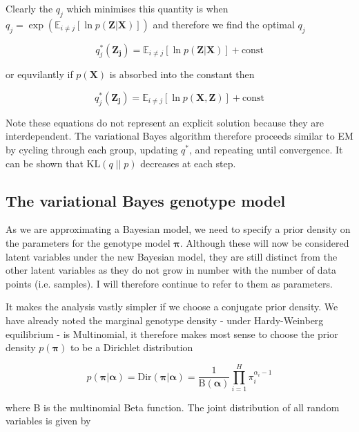 \documentclass{article}
\begin{document}
Clearly the $q_j$ which minimises this quantity is when $q_j = \exp(\mathbb{E}_{i \ne j}[\ln p(\boldsymbol{Z} | \boldsymbol{X})])$ and therefore we find the optimal $q_j$

\begin{equation}
q^*_j(\boldsymbol{Z_j}) = \mathbb{E}_{i \ne j}[\ln p(\boldsymbol{Z} | \boldsymbol{X})] + \text{const}
\end{equation}

or equvilantly if $p(\boldsymbol{X})$ is absorbed into the constant then

\begin{equation}
\label{eq:q_opt}
q^*_j(\boldsymbol{Z_j}) = \mathbb{E}_{i \ne j}[\ln p(\boldsymbol{X}, \boldsymbol{Z})] + \text{const}
\end{equation}

Note these equations do not represent an explicit solution because they are interdependent. The variational Bayes algorithm therefore proceeds similar to EM by cycling through each group, updating $q^*$, and repeating until convergence. It can be shown that $\text{KL}(q\; ||\; p)$ decreases at each step.

\subsection{The variational Bayes genotype model}

As we are approximating a Bayesian model, we need to specify a prior density on the parameters for the genotype model $\boldsymbol{\pi}$. Although these will now be considered latent variables under the new Bayesian model, they are still distinct from the other latent variables as they do not grow in number with the number of data points (i.e. samples). I will therefore continue to refer to them as parameters. 

It makes the analysis vastly simpler if we choose a conjugate prior density. We have already noted the marginal genotype density - under Hardy-Weinberg equilibrium - is Multinomial, it therefore makes most sense to choose the prior density $p(\boldsymbol{\pi})$ to be a Dirichlet distribution

\begin{equation}
p(\boldsymbol{\pi} | \boldsymbol{\alpha}) = \text{Dir}(\boldsymbol{\pi} | \boldsymbol{\alpha}) = \frac{1}{\text{B}(\boldsymbol{\alpha})} \prod_{i = 1}^H \pi_i^{\alpha_i - 1}
\end{equation}

where B is the multinomial Beta function. The joint distribution of all random variables is given by
\end{document}
